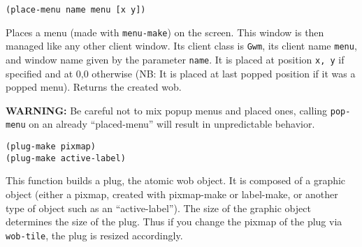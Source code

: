         
{\usagefont\begin{verbatim}
(place-menu name menu [x y])
\end{verbatim}}\usageupspace

Places a menu (made with \verb"menu-make") on the screen. This window is
then managed like any other client window. Its client class is \verb"Gwm",
its client name \verb"menu", and window name given by the parameter 
\verb"name".  It is
placed at position {\tt x, y} if specified and at 0,0 otherwise
(NB: It is placed at last popped
position if it was a popped menu). Returns the created wob.

{\bf WARNING:} Be careful not to mix popup menus and placed ones, calling
\verb"pop-menu" on an already ``placed-menu'' will result in unpredictable
behavior. 

        
{\usagefont\begin{verbatim}
(plug-make pixmap)
(plug-make active-label)
\end{verbatim}}\usageupspace

This function builds a plug, the atomic wob object. It is composed of a
graphic object (either a pixmap, created with pixmap-make or label-make, or
another type of object such as an ``active-label''). The size of the
graphic object determines the size of the plug.  Thus if you change the
pixmap of the plug via \verb"wob-tile", the plug is resized
accordingly.


